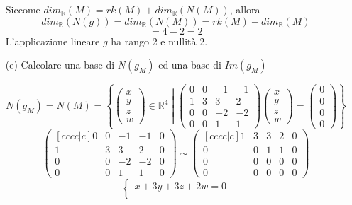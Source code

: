 \documentclass[a4paper]{article}
\theoremstyle{break}
\theoremstyle{break}
\theoremstyle{break}
\theoremstyle{break}
\begin{document}
\begin{enumerate}
    \vspace{1em}
    \noindent Siccome \( dim_{\mathbb{R}}(M) = rk(M) + dim_{\mathbb{R}}(N(M)) \),
    allora
    \[
     dim_{\mathbb{R}}(N(g)) = dim_{\mathbb{R}}(N(M)) = rk(M) - dim_{\mathbb{R}}(M)
    \] 
    \[
    = 4 - 2 = 2
    \] 
    L'applicazione lineare \( g \) ha rango 2 e nullità 2.

	\item[(e)] Calcolare una base di \( N(g_M) \) ed una base di \( Im(g_M) \)

    \vspace{1em}
    \[
    N(g_M) = N(M) = \left\{\left. \begin{pmatrix} x\\y\\z\\w \end{pmatrix} \in \mathbb{R}^4 \;\right|\; 
    \begin{pmatrix} 
      0 & 0 & -1 & -1\\
      1 & 3 & 3 & 2\\
      0 & 0 & -2 & -2\\
      0 & 0 & 1 & 1
    \end{pmatrix} \begin{pmatrix} x\\y\\z\\w \end{pmatrix} = \begin{pmatrix} 0\\0\\0\\0 \end{pmatrix} \right\}
    \] 
    \[
      \begin{pmatrix}[cccc|c] 
        0 & 0 & -1 & -1 & 0\\
        1 & 3 & 3 & 2 & 0\\
        0 & 0 & -2 & -2 & 0\\
        0 & 0 & 1 & 1 & 0
    \end{pmatrix}
    \sim
    \begin{pmatrix}[cccc|c] 
      1 & 3 & 3 & 2 & 0\\
      0 & 0 & 1 & 1 & 0\\
      0 & 0 & 0 & 0 & 0\\
      0 & 0 & 0 & 0 & 0
    \end{pmatrix}
    \] 
    \[
      \begin{cases}
        x + 3y + 3z + 2w = 0\\

\end{cases}\]
\end{enumerate}
\end{document}

